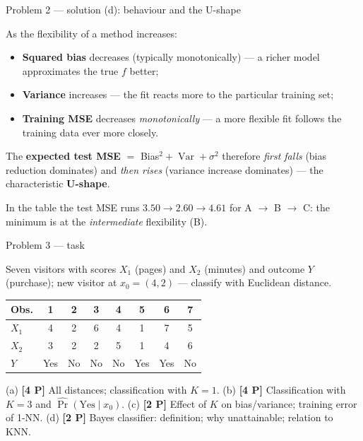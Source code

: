 \documentclass[aspectratio=169,11pt]{beamer}
\begin{document}
\begin{frame}{Problem 2 --- solution (d): behaviour and the U-shape}
  \begin{solutionbox}
    As the flexibility of a method increases:
    \begin{itemize}
      \item \textbf{Squared bias} decreases (typically monotonically) --- a richer model
        approximates the true $f$ better;
      \item \textbf{Variance} increases --- the fit reacts more to the particular training set;
      \item \textbf{Training MSE} decreases \emph{monotonically} --- a more flexible fit follows
        the training data ever more closely.
    \end{itemize}
    The \textbf{expected test MSE} $=$ Bias$^2+\operatorname{Var}+\sigma^2$ therefore \emph{first
    falls} (bias reduction dominates) and \emph{then rises} (variance increase dominates) ---
    the characteristic \textbf{U-shape}.
    \medskip

    In the table the test MSE runs $3.50 \to 2.60 \to 4.61$ for A $\to$ B $\to$ C: the minimum is
    at the \emph{intermediate} flexibility (B).
  \end{solutionbox}
\end{frame}

\begin{frame}{Problem 3 --- task}
  \begin{exercise}
    Seven visitors with scores $X_1$ (pages) and $X_2$ (minutes) and outcome $Y$ (purchase);
    new visitor at $x_0=(4{{,}}2)$ --- classify with Euclidean distance.
    \begin{center}\scriptsize
    \begin{tabular}{lccccccc}
      \toprule
      Obs. & 1 & 2 & 3 & 4 & 5 & 6 & 7\\
      \midrule
      $X_1$ & 4 & 2 & 6 & 4 & 1 & 7 & 5\\
      $X_2$ & 3 & 2 & 2 & 5 & 1 & 4 & 6\\
      $Y$ & Yes & No & No & No & Yes & Yes & No\\
      \bottomrule
    \end{tabular}
    \end{center}
    (a) \textbf{[4 P]} All distances; classification with $K=1$.
    (b) \textbf{[4 P]} Classification with $K=3$ and $\widehat{\Pr}(\text{Yes}\mid x_0)$.
    (c) \textbf{[2 P]} Effect of $K$ on bias/variance; training error of 1-NN.
    (d) \textbf{[2 P]} Bayes classifier: definition; why unattainable; relation to KNN.
  \end{exercise}
\end{frame}
\end{document}
